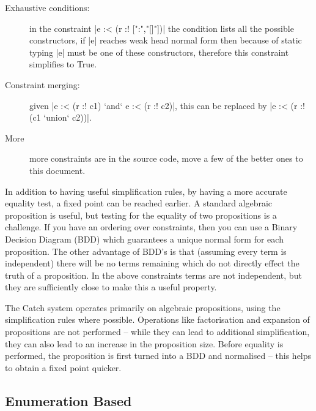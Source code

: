 \documentclass[preprint]{sigplanconf}
\begin{document}
\begin{description}
\item[Exhaustive conditions:] in the constraint |e :< (r :! [":","[]"])| the condition lists all the possible constructors, if |e| reaches weak head normal form then because of static typing |e| must be one of these constructors, therefore this constraint simplifies to True.

\item[Constraint merging:] given |e :< (r :! c1) `and` e :< (r :! c2)|, this can be replaced by |e :< (r :! (c1 `union` c2))|.

\item[More] more constraints are in the source code, move a few of the better ones to this document.
\end{description}

In addition to having useful simplification rules, by having a more accurate equality test, a fixed point can be reached earlier. A standard algebraic proposition is useful, but testing for the equality of two propositions is a challenge. If you have an ordering over constraints, then you can use a Binary Decision Diagram (BDD) which guarantees a unique normal form for each proposition. The other advantage of BDD's is that (assuming every term is independent) there will be no terms remaining which do not directly effect the truth of a proposition. In the above constraints terms are not independent, but they are sufficiently close to make this a useful property.

The Catch system operates primarily on algebraic propositions, using the simplification rules where possible. Operations like factorisation and expansion of propositions are not performed -- while they can lead to additional simplification, they can also lead to an increase in the proposition size. Before equality is performed, the proposition is first turned into a BDD and normalised -- this helps to obtain a fixed point quicker.

\subsection{Enumeration Based}
\end{document}
